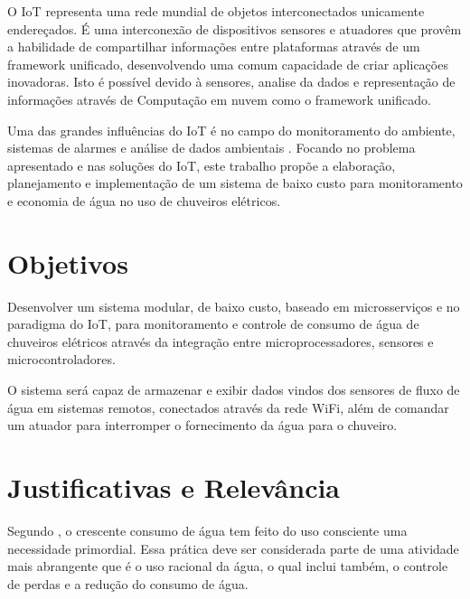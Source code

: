 O IoT representa uma rede mundial de objetos interconectados unicamente endereçados. É uma interconexão de dispositivos sensores e atuadores que provêm a habilidade de compartilhar informações entre plataformas através de um framework unificado, desenvolvendo uma comum capacidade de criar aplicações inovadoras. Isto é possível devido à sensores, analise da dados e representação de informações através de Computação em nuvem como o framework unificado. \cite{RisteskaStojkoska2017}

Uma das grandes influências do IoT é no campo do monitoramento do ambiente, sistemas de alarmes e análise de dados ambientais \cite{Perumal2016}. Focando no problema apresentado e nas soluções do IoT, este trabalho propõe a elaboração, planejamento e implementação de um sistema de baixo custo para monitoramento e economia de água no uso de chuveiros elétricos.



\section{Objetivos}

Desenvolver um sistema modular, de baixo custo, baseado em microsserviços e no paradigma do IoT, para monitoramento e controle de consumo de água de chuveiros elétricos através da integração entre microprocessadores, sensores e microcontroladores. 

O sistema será capaz de armazenar e exibir dados vindos dos sensores de fluxo de água em sistemas remotos, conectados através da rede WiFi, além de comandar um atuador para interromper o fornecimento da água para o chuveiro.


\section{Justificativas e Relev{\^a}ncia}
%
Segundo \cite{AlvesDaSilva}, o crescente consumo de água
tem feito do uso consciente uma necessidade primordial. Essa prática deve ser considerada parte de uma atividade mais abrangente que é o uso racional da água, o qual inclui também, o controle de perdas e a redução do consumo de água.

